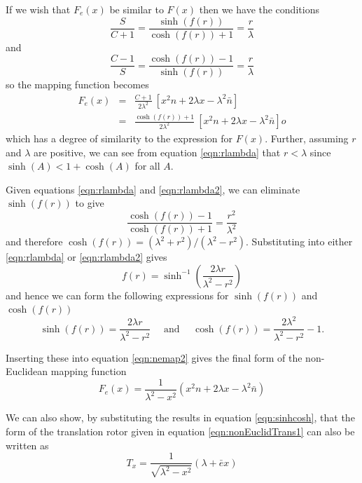 If we wish that $F_e(x)$ be similar to $F(x)$ then we have the conditions
\begin{equation}
\frac{S}{C + 1} = \frac{\sinh(f(r))}{\cosh(f(r)) + 1} = \frac{r}{\lambda}
\label{eqn:rlambda}
\end{equation}
and
\begin{equation}
\frac{C-1}{S} = \frac{\cosh(f(r)) - 1}{\sinh(f(r))} = \frac{r}{\lambda}
\label{eqn:rlambda2}
\end{equation}
so the mapping function becomes
\begin{eqnarray}
F_e(x) &=& \frac{C+1}{2\lambda^2}\ [x^2n + 2\lambda x - \lambda^2 \bar{n}] \\
&=& \frac{\cosh(f(r)) + 1}{2\lambda^2}\ [x^2n + 2\lambda x - \lambda^2 \bar{n}]o\label{eqn:nemap2}
\end{eqnarray}
which has a degree of similarity to the expression for $F(x)$. Further, 
assuming $r$ and $\lambda$ are positive, we can see from equation
\ref{eqn:rlambda} that $r < \lambda$ since $\sinh(A) < 1 + \cosh(A)$
for all $A$.

Given equations \ref{eqn:rlambda} and \ref{eqn:rlambda2}, we can eliminate
$\sinh(f(r))$ to give
\begin{equation}
\frac{\cosh(f(r)) -1}{\cosh(f(r)) + 1} = \frac{r^2}{\lambda^2}
\end{equation}
and therefore $\cosh(f(r)) = (\lambda^2 + r^2)/(\lambda^2 - r^2)$. Substituting
into either \ref{eqn:rlambda} or \ref{eqn:rlambda2} gives
\begin{equation}
f(r) = \sinh^{-1}\left( \frac{2\lambda r}{\lambda^2 - r^2} \right)
\end{equation}
and hence we can form the following expressions for 
$\sinh(f(r))$ and $\cosh(f(r))$
\begin{equation}
\sinh(f(r)) = \frac{2\lambda r}{\lambda^2 - r^2} \quad \mbox{ and } \quad
\cosh(f(r)) = \frac{2\lambda^2}{\lambda^2 - r^2} - 1.
\label{eqn:sinhcosh}
\end{equation}

Inserting these into equation \ref{eqn:nemap2} gives the final form
of the non-Euclidean mapping function
\begin{equation}
F_e(x) = \frac{1}{\lambda^2 - x^2}(x^2n + 2\lambda x - \lambda^2\bar{n})
\label{eqn:nonEuclidMapping}
\end{equation}

We can also show, by substituting the results in equation \ref{eqn:sinhcosh}, 
that the form of the translation rotor given in 
equation \ref{eqn:nonEuclidTrans1} can also be written as
\begin{equation}
T_x = \frac{1}{\sqrt{\lambda^2 - x^2}}(\lambda + \bar{e}x)
\label{eqn:transrotor}
\end{equation}

